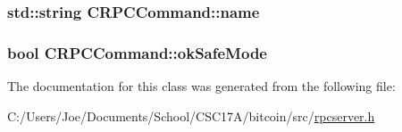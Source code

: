\subsubsection[{name}]{\setlength{\rightskip}{0pt plus 5cm}std\+::string C\+R\+P\+C\+Command\+::name}\label{class_c_r_p_c_command_a8da584c0d2d98be22ebff74d3cf2221c}
\hypertarget{class_c_r_p_c_command_a7f0b10e619917a3019f36ba5fa538adb}{}
\subsubsection[{ok\+Safe\+Mode}]{\setlength{\rightskip}{0pt plus 5cm}bool C\+R\+P\+C\+Command\+::ok\+Safe\+Mode}\label{class_c_r_p_c_command_a7f0b10e619917a3019f36ba5fa538adb}


The documentation for this class was generated from the following file\+:\begin{DoxyCompactItemize}
\item 
C\+:/\+Users/\+Joe/\+Documents/\+School/\+C\+S\+C17\+A/bitcoin/src/\hyperlink{rpcserver_8h}{rpcserver.\+h}\end{DoxyCompactItemize}
